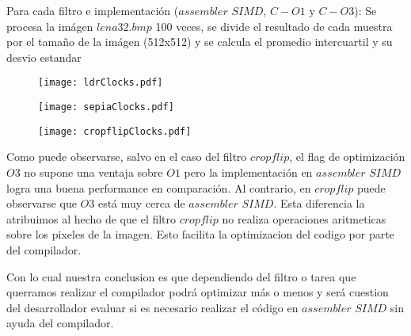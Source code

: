 Para cada filtro e implementación ($assembler$ $SIMD$, $C-O1$ y $C-O3$): Se procesa la imágen $lena32.bmp$ 100 veces, se divide el resultado de cada muestra por el tamaño de la imágen (512x512) y se calcula el promedio intercuartil y su desvio estandar

\begin{figure}[h]
  \begin{center}
	\texttt{[image: ldrClocks.pdf]}
  \end{center}
\end{figure}

\begin{figure}[h]
  \begin{center}
	\texttt{[image: sepiaClocks.pdf]}
  \end{center}
\end{figure}

\newpage

\begin{figure}
  \begin{center}
	\texttt{[image: cropflipClocks.pdf]}
  \end{center}
\end{figure}

Como puede observarse, salvo en el caso del filtro $cropflip$, el flag de optimización $O3$ no supone una ventaja sobre $O1$ pero la implementación en $assembler$ $SIMD$ logra una buena performance en comparación. Al contrario, en $cropflip$ puede observarse que $O3$ está muy cerca de $assembler$ $SIMD$. Esta diferencia la atribuimos al hecho de que el filtro $cropflip$ no realiza operaciones aritmeticas sobre los pixeles de la imagen. Esto facilita la optimizacion del codigo por parte del compilador. 

Con lo cual nuestra conclusion es que dependiendo del filtro o tarea que querramos realizar el compilador podrá optimizar más o menos y será cuestion del desarrollador evaluar si es necesario realizar el código en $assembler$ $SIMD$ sin ayuda del compilador. 

